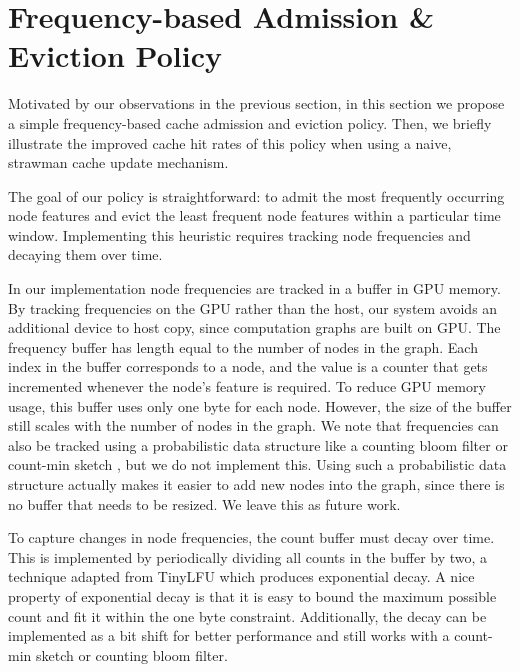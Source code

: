
\section{Frequency-based Admission \& Eviction Policy} \label{Design: Policy}
Motivated by our observations in the previous section, in this section we propose a simple frequency-based cache admission and eviction policy. Then, we briefly illustrate the improved cache hit rates of this policy when using a naive, strawman cache update mechanism.

The goal of our policy is straightforward: to admit the most frequently occurring node features and evict the least frequent node features within a particular time window. Implementing this heuristic requires tracking node frequencies and decaying them over time.

In our implementation node frequencies are tracked in a buffer in GPU memory. By tracking frequencies on the GPU rather than the host, our system avoids an additional device to host copy, since computation graphs are built on GPU. The frequency buffer has length equal to the number of nodes in the graph.
Each index in the buffer corresponds to a node, and the value is a counter that gets incremented whenever the node's feature is required.
To reduce GPU memory usage, this buffer uses only one byte for each node. 
However, the size of the buffer still scales with the number of nodes in the graph. We note that frequencies can also be tracked using a probabilistic data structure like a counting bloom filter \cite{Bloom_Filter_2000} or count-min sketch \cite{CountMinSketch_2005}, but we do not implement this.
Using such a probabilistic data structure actually makes it easier to add new nodes into the graph, since there is no buffer that needs to be resized.
We leave this as future work.

To capture changes in node frequencies, the count buffer must decay over time.
This is implemented by periodically dividing all counts in the buffer by two, a technique adapted from TinyLFU \cite{TinyLFU_2014} which produces exponential decay.
A nice property of exponential decay is that it is easy to bound the maximum possible count and fit it within the one byte constraint. 
Additionally, the decay can be implemented as a bit shift for better performance and still works with a count-min sketch or counting bloom filter.

